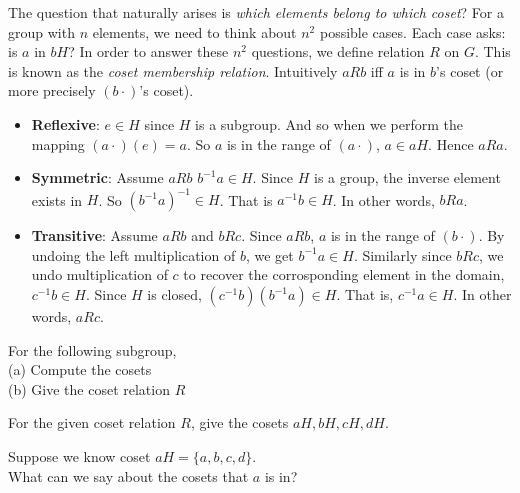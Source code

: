 The question that naturally arises is \textit{which elements belong to which coset}?
For a group with $n$ elements, we need to think about $n^2$ possible cases. 
Each case asks: is $a$ in $bH$? In order to answer these $n^2$ questions, 
we define relation $R$ on $G$. This is known as the \textit{coset membership relation}.
Intuitively $aRb$ iff $a$ is in $b$'s coset (or more precisely $(b\cdot)$'s coset). 











\begin{itemize}
\item \textbf{Reflexive}: $e \in H$ since $H$ is a subgroup. 
And so when we perform the mapping $(a\cdot)(e) = a$. So $a$ is in the range of $(a\cdot)$, $a \in aH$. 
Hence $aRa$.
\item \textbf{Symmetric}:  Assume $aRb$
$b^{-1}a \in H$. Since $H$ is a group, the inverse element exists in $H$. 
So $(b^{-1}a)^{-1} \in H$. That is $a^{-1}b \in H$. 
In other words, $bRa$.
\item \textbf{Transitive}: Assume $aRb$ and $bRc$. 
Since $aRb$, $a$ is in the range of $(b\cdot)$. 
By undoing the left multiplication of $b$, we get $b^{-1}a \in H$. 
Similarly since $bRc$, we undo multiplication of $c$ to recover the 
corrosponding element in the domain, $c^{-1}b \in H$. 
Since $H$ is closed, $(c^{-1}b)(b^{-1}a) \in H$. That is, $c^{-1}a \in H$. In other words, 
$aRc$. 
\end{itemize}

\frmrule

\begin{example}
For the following subgroup,\\
(a) Compute the cosets \\
(b) Give the coset relation $R$
\end{example}

\frmrule

\begin{example}
For the given coset relation $R$, give the cosets $aH, bH, cH, dH$.
\end{example}

\begin{example}
Suppose we know coset $aH = \{a,b,c,d\}$. \\
What can we say about the cosets that $a$ is in?
\end{example}

